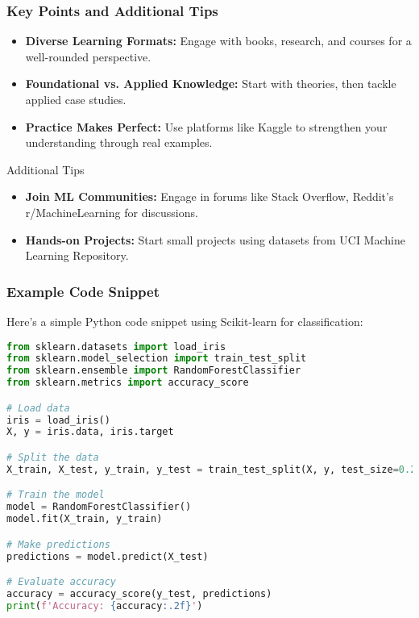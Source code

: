 \documentclass[aspectratio=169]{beamer}
\begin{document}
\begin{frame}[fragile]
    \frametitle{Key Points and Additional Tips}
    \begin{itemize}
        \item \textbf{Diverse Learning Formats:} Engage with books, research, and courses for a well-rounded perspective.
        \item \textbf{Foundational vs. Applied Knowledge:} Start with theories, then tackle applied case studies.
        \item \textbf{Practice Makes Perfect:} Use platforms like Kaggle to strengthen your understanding through real examples.
    \end{itemize}

    \begin{block}{Additional Tips}
        \begin{itemize}
            \item \textbf{Join ML Communities:} Engage in forums like Stack Overflow, Reddit’s r/MachineLearning for discussions.
            \item \textbf{Hands-on Projects:} Start small projects using datasets from UCI Machine Learning Repository.
        \end{itemize}
    \end{block}
\end{frame}

\begin{frame}[fragile]
    \frametitle{Example Code Snippet}
    Here's a simple Python code snippet using Scikit-learn for classification:

    \begin{lstlisting}[language=Python]
from sklearn.datasets import load_iris
from sklearn.model_selection import train_test_split
from sklearn.ensemble import RandomForestClassifier
from sklearn.metrics import accuracy_score

# Load data
iris = load_iris()
X, y = iris.data, iris.target

# Split the data
X_train, X_test, y_train, y_test = train_test_split(X, y, test_size=0.2, random_state=42)

# Train the model
model = RandomForestClassifier()
model.fit(X_train, y_train)

# Make predictions
predictions = model.predict(X_test)

# Evaluate accuracy
accuracy = accuracy_score(y_test, predictions)
print(f'Accuracy: {accuracy:.2f}')
    \end{lstlisting}
\end{frame}
\end{document}
